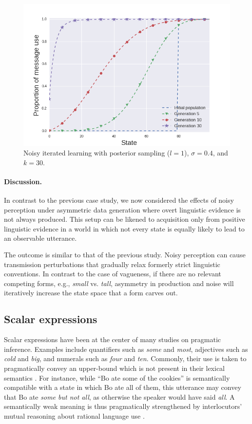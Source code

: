 \documentclass[10pt,a4paper]{article}
\begin{document}
\begin{figure}[ht]
\centering
    \includegraphics[scale=0.4]{../code/plots/deflation-sigma04.png}
  \caption{Noisy iterated learning with posterior sampling ($l=1$), $\sigma = 0.4$, and $k = 30$.}
  \label{fig:defl}
\end{figure}

\paragraph{Discussion.} In contrast to the previous case study, we now considered the effects
of noisy perception under asymmetric data generation where overt linguistic evidence is not
always produced. This setup can be likened to acquisition only from positive linguistic
evidence in a world in which not every state is equally likely to lead to an observable
utterance. %

The outcome is similar to that of the previous study. Noisy perception can cause transmission
perturbations that gradually relax formerly strict linguistic conventions. In contrast to the
case of vagueness, if there are no relevant competing forms, e.g., {\em small} vs. {\em tall},
asymmetry in production and noise will iteratively increase the state space that a form carves
out.

\subsection{Scalar expressions}
Scalar expressions have been at the center of many studies on pragmatic inference. Examples
include quantifiers such as {\em some} and {\em most}, adjectives such as {\em cold} and {\em
  big}, and numerals such as {\em four} and {\em ten}. Commonly, their use is taken to
pragmatically convey an upper-bound which is not present in their lexical semantics
\citep{horn:1972,gazdar:1979}. For instance, while ``Bo ate some of the cookies'' is
semantically compatible with a state in which Bo ate all of them, this utterance may convey
that Bo ate {\em some but not all}, as otherwise the speaker would have said {\em all}. A
semantically weak meaning is thus pragmatically strengthened by interlocutors' mutual reasoning
about rational language use \citep{grice:1975}. 
\end{document}
